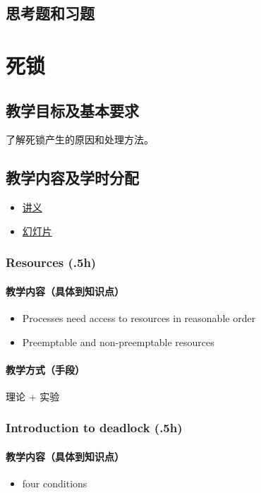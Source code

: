 \documentclass[11pt]{article}
\begin{document}
\subsection{思考题和习题}
\label{sec-4-6}
\section{死锁}
\label{sec-5}
\subsection{教学目标及基本要求}
\label{sec-5-1}
了解死锁产生的原因和处理方法。
\subsection{教学内容及学时分配}
\label{sec-5-2}
\begin{itemize}
\item \href{./slides/deadlock-a.pdf}{讲义}
\item \href{./slides/deadlock-b.pdf}{幻灯片}
\end{itemize}
\subsubsection{Resources (.5h)}
\label{sec-5-2-1}
\paragraph{教学内容（具体到知识点）}
\label{sec-5-2-1-1}
\begin{itemize}
\item Processes need access to resources in reasonable order
\item Preemptable and non-preemptable resources
\end{itemize}
\paragraph{教学方式（手段）}
\label{sec-5-2-1-2}
理论 + 实验
\subsubsection{Introduction to deadlock (.5h)}
\label{sec-5-2-2}
\paragraph{教学内容（具体到知识点）}
\label{sec-5-2-2-1}
\begin{itemize}
\item four conditions
\end{itemize}
\end{document}

